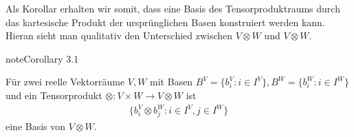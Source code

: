 \documentclass[letterpaper,10pt,english]{jupyterBook}
\begin{document}
\sphinxAtStartPar
Als Korollar erhalten wir somit, dass eine Basis des Tensorproduktraums durch das kartesische Produkt der ursprünglichen Basen konstruiert werden kann. Hieran sieht man qualitativ den Unterschied zwischen \(V\otimes W\) und \(V\otimes W\).
\label{vektoranalysis/tensor:corollary-3}
\begin{sphinxadmonition}{note}{Corollary 3.1}



\sphinxAtStartPar
Für zwei reelle Vektorräume \(V,W\) mit Basen \(B^V = \{b_i^V: i\in I^V\}, B^W = \{b_i^W: i\in I^W\}\) und ein Tensorprodukt \(\otimes:V\times W\to V\otimes W\) ist
\begin{equation*}
\begin{split}\{b_i^V\otimes b_j^W: i\in I^V, j\in I^W\}\end{split}
\end{equation*}
\sphinxAtStartPar
eine Basis von \(V\otimes W\).
\end{sphinxadmonition}
\end{document}
